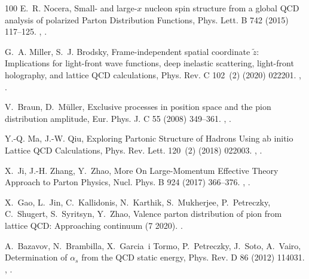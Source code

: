 \begin{thebibliography}{100}
E.~R. Nocera, {Small- and large-$x$ nucleon spin structure from a global QCD
  analysis of polarized Parton Distribution Functions}, Phys. Lett. B 742
  (2015) 117--125.
\newblock \href {http://arxiv.org/abs/1410.7290} {},
  \href {https://doi.org/10.1016/j.physletb.2015.01.021}
  {}.

G.~A. Miller, S.~J. Brodsky, {Frame-independent spatial coordinate $\tilde{z}$:
  Implications for light-front wave functions, deep inelastic scattering,
  light-front holography, and lattice QCD calculations}, Phys. Rev. C 102~(2)
  (2020) 022201.
\newblock \href {http://arxiv.org/abs/1912.08911} {},
  \href {https://doi.org/10.1103/PhysRevC.102.022201}
  {}.

V.~Braun, D.~M\"uller, {Exclusive processes in position space and the pion
  distribution amplitude}, Eur. Phys. J. C 55 (2008) 349--361.
\newblock \href {http://arxiv.org/abs/0709.1348} {},
  \href {https://doi.org/10.1140/epjc/s10052-008-0608-4}
  {}.

Y.-Q. Ma, J.-W. Qiu, {Exploring Partonic Structure of Hadrons Using ab initio
  Lattice QCD Calculations}, Phys. Rev. Lett. 120~(2) (2018) 022003.
\newblock \href {http://arxiv.org/abs/1709.03018} {},
  \href {https://doi.org/10.1103/PhysRevLett.120.022003}
  {}.

X.~Ji, J.-H. Zhang, Y.~Zhao, {More On Large-Momentum Effective Theory Approach
  to Parton Physics}, Nucl. Phys. B 924 (2017) 366--376.
\newblock \href {http://arxiv.org/abs/1706.07416} {},
  \href {https://doi.org/10.1016/j.nuclphysb.2017.09.001}
  {}.

X.~Gao, L.~Jin, C.~Kallidonis, N.~Karthik, S.~Mukherjee, P.~Petreczky,
  C.~Shugert, S.~Syritsyn, Y.~Zhao, {Valence parton distribution of pion from
  lattice QCD: Approaching continuum} (7 2020).
\newblock \href {http://arxiv.org/abs/2007.06590} {}.

A.~Bazavov, N.~Brambilla, X.~Garcia~i Tormo, P.~Petreczky, J.~Soto, A.~Vairo,
  {Determination of $\alpha_s$ from the QCD static energy}, Phys. Rev. D 86
  (2012) 114031.
\newblock \href {http://arxiv.org/abs/1205.6155} {},
  \href {https://doi.org/10.1103/PhysRevD.86.114031}
  {}.


\end{thebibliography}
